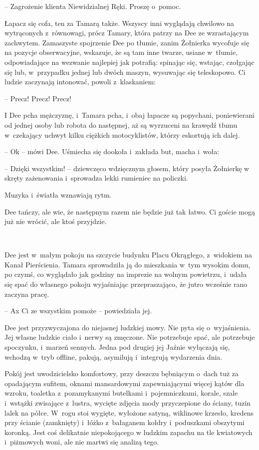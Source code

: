 \documentclass[oneside,polish,11pt,sfheadings]{mwbk}
\begin{document}
-- Zagrożenie klienta Niewidzialnej Ręki. Proszę o~pomoc.

Łapacz się cofa, ten za Tamarą także. Wszyscy inni wyglądają chwilowo na
wytrąconych z~równowagi, prócz Tamary, która patrzy na Dee ze
wzrastającym zachwytem. Zamaszyste spojrzenie Dee po tłumie, zanim
Żołnierka wycofuje się na pozycje obserwacyjne, wskazuje, że są tam inne
twarze, usiane w~tłumie, odpowiadające na wezwanie najlepiej jak
potrafią: spinając się, wstając, czołgając się lub, w~przypadku jednej
lub dwóch maszyn, wysuwając się teleskopowo. Ci ludzie zaczynają
intonować, powoli z~klaskaniem: 

-- Precz! Precz! Precz!

I Dee pcha mężczyznę, i~Tamara pcha, i~obaj łapacze są popychani,
poniewierani od jednej osoby lub robota do następnej, aż są wyrzuceni na
krawędź tłumu w~czekający uchwyt kilku ciężkich motocyklistów, którzy
eskortują ich dalej.

-- Ok -- mówi Dee. Uśmiecha się dookoła i~zakłada but, macha i~woła: 

-- Dzięki wszystkim! -- dziewczęco wdzięcznym głosem, który posyła Żołnierkę
w skręty zażenowania i~sprowadza lekki rumieniec na policzki.

Muzyka i~światła wznawiają rytm.

Dee tańczy, ale wie, że następnym razem nie będzie już tak łatwo. Ci
goście mogą już nie wrócić, ale ktoś przyjdzie.

~

Dee jest w~małym pokoju na szczycie budynku Placu Okrągłego, z~widokiem
na Kanał Pierścienia. Tamara sprowadziła ją do mieszkania w~tym wysokim
domu, po czymś, co wyglądało jak godziny na imprezie na wolnym
powietrzu, i~udała się spać do własnego pokoju wyjaśniając
przepraszająco, że jutro wcześnie rano zaczyna pracę. 

-- Ax Ci ze
wszystkim pomoże -- powiedziała jej.

Dee jest przyzwyczajona do niejasnej ludzkiej mowy. Nie pyta się o~wyjaśnienia. Jej własne ludzkie ciało i~nerwy są zmęczone. Nie
potrzebuje spać, ale potrzebuje spoczynku, i~marzeń sennych. Jedna pod
drugiej jej Jaźnie wyłączają się, wchodzą w~tryb offline, pakują,
asymilują i~integrują wydarzenia dnia.

Pokój jest uwodzicielsko komfortowy, przy deszczu bębniącym o~dach tuż
za opadającym sufitem, oknami mansardowymi zapewniającymi więcej kątów
dla wzroku, toaletka z~pozamykanymi butelkami i~pojemniczkami, korale,
szale i~wstążki zwisające z~lustra, wycięte zdjęcia mody przyczepione do
ściany, tuzin lalek na półce. W~rogu stoi wygięte, wyłożone satyną,
wiklinowe krzesło, kredens przy ścianie (zamknięty) i~łóżko z~bałaganem
kołdry i~poduszkami obszytymi koronką. Jest coś delikatnie niepokojącego
w ludzkim zapachu na tle kwiatowych i~piżmowych woni, ale nie martwi się
analizą tego.
\end{document}
